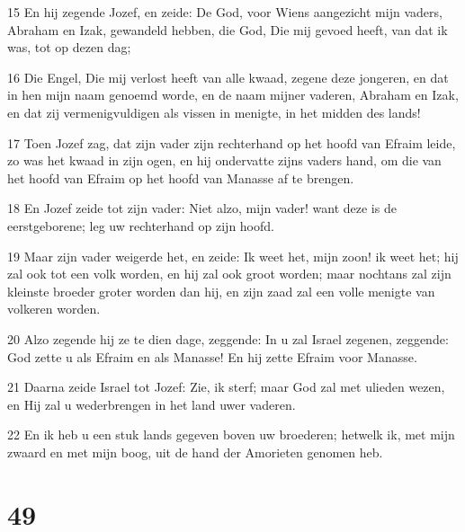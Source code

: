 \par 15 En hij zegende Jozef, en zeide: De God, voor Wiens aangezicht mijn vaders, Abraham en Izak, gewandeld hebben, die God, Die mij gevoed heeft, van dat ik was, tot op dezen dag;
\par 16 Die Engel, Die mij verlost heeft van alle kwaad, zegene deze jongeren, en dat in hen mijn naam genoemd worde, en de naam mijner vaderen, Abraham en Izak, en dat zij vermenigvuldigen als vissen in menigte, in het midden des lands!
\par 17 Toen Jozef zag, dat zijn vader zijn rechterhand op het hoofd van Efraim leide, zo was het kwaad in zijn ogen, en hij ondervatte zijns vaders hand, om die van het hoofd van Efraim op het hoofd van Manasse af te brengen.
\par 18 En Jozef zeide tot zijn vader: Niet alzo, mijn vader! want deze is de eerstgeborene; leg uw rechterhand op zijn hoofd.
\par 19 Maar zijn vader weigerde het, en zeide: Ik weet het, mijn zoon! ik weet het; hij zal ook tot een volk worden, en hij zal ook groot worden; maar nochtans zal zijn kleinste broeder groter worden dan hij, en zijn zaad zal een volle menigte van volkeren worden.
\par 20 Alzo zegende hij ze te dien dage, zeggende: In u zal Israel zegenen, zeggende: God zette u als Efraim en als Manasse! En hij zette Efraim voor Manasse.
\par 21 Daarna zeide Israel tot Jozef: Zie, ik sterf; maar God zal met ulieden wezen, en Hij zal u wederbrengen in het land uwer vaderen.
\par 22 En ik heb u een stuk lands gegeven boven uw broederen; hetwelk ik, met mijn zwaard en met mijn boog, uit de hand der Amorieten genomen heb.

\chapter{49}

